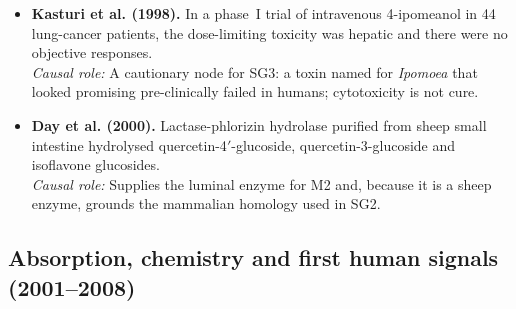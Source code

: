 \documentclass[11pt,a4paper]{article}
\newenvironment{litlist}{\begin{itemize}[leftmargin=2.6em,labelwidth=2.2em,labelsep=0.4em,align=left,itemsep=5pt,topsep=4pt]}{\end{itemize}}
\newcommand{\litentry}[4]{\item[\cite{#1}] \textbf{\color{navy}#2.} #3\\[1pt]
  {\color{teal}\textit{Causal role:}} #4}
\begin{document}
\begin{litlist}
\litentry{kasturi1998}{Kasturi et al. (1998)}{In a phase~I trial of intravenous 4-ipomeanol in 44 lung-cancer patients, the dose-limiting toxicity was hepatic and there were no objective responses.}{A cautionary node for SG3: a toxin named for \emph{Ipomoea} that looked promising pre-clinically failed in humans; cytotoxicity is not cure.}

\litentry{day2000}{Day et al. (2000)}{Lactase-phlorizin hydrolase purified from sheep small intestine hydrolysed quercetin-4$'$-glucoside, quercetin-3-glucoside and isoflavone glucosides.}{Supplies the luminal enzyme for M2 and, because it is a sheep enzyme, grounds the mammalian homology used in SG2.}
\end{litlist}

\subsection{Absorption, chemistry and first human signals (2001--2008)}
\end{document}
